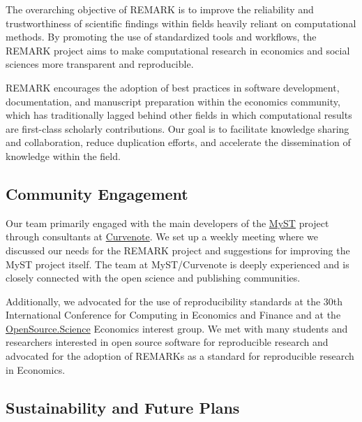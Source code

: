 \documentclass{article}
\begin{document}

The overarching objective of REMARK is to improve the reliability and trustworthiness of scientific findings within fields heavily reliant on computational methods. By promoting the use of standardized tools and workflows, the REMARK project aims to make computational research in economics and social sciences more transparent and reproducible.

REMARK encourages the adoption of best practices in software development, documentation, and manuscript preparation within the economics community, which has traditionally lagged behind other fields in which computational results are first-class scholarly contributions. Our goal is to facilitate knowledge sharing and collaboration, reduce duplication efforts, and accelerate the dissemination of knowledge within the field.

\subsection{Community Engagement}


Our team primarily engaged with the main developers of the \href{https://github.com/jupyter-book/mystmd}{MyST} project through consultants at \href{https://curvenote.com/}{Curvenote}. We set up a weekly meeting where we discussed our needs for the REMARK project and suggestions for improving the MyST project itself. The team at MyST/Curvenote is deeply experienced and is closely connected with the open science and publishing communities.

Additionally, we advocated for the use of reproducibility standards at the 30th International Conference for Computing in Economics and Finance and at the \href{https://opensource.science/}{OpenSource.Science} Economics interest group. We met with many students and researchers interested in open source software for reproducible research and advocated for the adoption of REMARKs as a standard for reproducible research in Economics.

\subsection{Sustainability and Future Plans}
\end{document}
